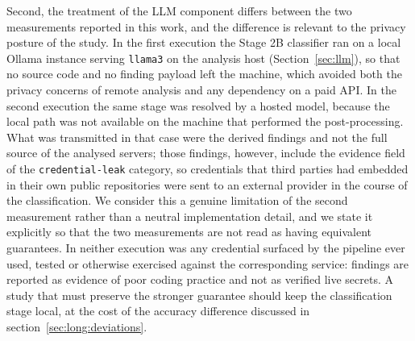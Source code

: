 %
%

Second, the treatment of the LLM component differs between the two measurements
reported in this work, and the difference is relevant to the privacy posture of
the study. In the first execution the Stage 2B classifier ran on a local Ollama
instance serving \texttt{llama3} on the analysis host (Section~\ref{sec:llm}),
so that no source code and no finding payload left the machine, which avoided
both the privacy concerns of remote analysis and any dependency on a paid API.
In the second execution the same stage was resolved by a hosted model, because
the local path was not available on the machine that performed the
post-processing. What was transmitted in that case were the derived findings and
not the full source of the analysed servers; those findings, however, include
the evidence field of the \texttt{credential-leak} category, so credentials that
third parties had embedded in their own public repositories were sent to an
external provider in the course of the classification. We consider this a
genuine limitation of the second measurement rather than a neutral
implementation detail, and we state it explicitly so that the two measurements
are not read as having equivalent guarantees. In neither execution was any
credential surfaced by the pipeline ever used, tested or otherwise exercised
against the corresponding service: findings are reported as evidence of poor
coding practice and not as verified live secrets. A study that must preserve the
stronger guarantee should keep the classification stage local, at the cost of
the accuracy difference discussed in section~\ref{sec:long:deviations}.
